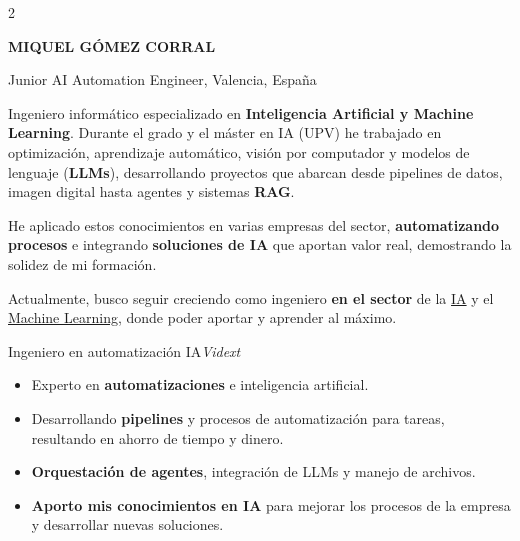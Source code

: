 \documentclass{miquelcv}
\begin{document}
\setlength{\columnsep}{0.95cm}
\begin{paracol}{2}


{\color{cvdarkblue}\Huge\bfseries MIQUEL GÓMEZ CORRAL}

\vspace{4pt}
{\color{cvblue}\large Junior AI Automation Engineer, Valencia, España}

\vspace{8pt}
{\small
Ingeniero informático especializado en \textbf{Inteligencia Artificial y Machine Learning}. Durante el grado y el máster en IA (UPV) he trabajado en optimización, aprendizaje automático, visión por computador y modelos de lenguaje (\textbf{LLMs}), desarrollando proyectos que abarcan desde pipelines de datos, imagen digital hasta agentes y sistemas \textbf{RAG}.

\vspace{4pt}
He aplicado estos conocimientos en varias empresas del sector, \textbf{automatizando procesos} e integrando \textbf{soluciones de IA} que aportan valor real, demostrando la solidez de mi formación.

\vspace{4pt}
Actualmente, busco seguir creciendo como ingeniero \textbf{en el sector} de la \underline{IA} y el \underline{Machine Learning}, donde poder aportar y aprender al máximo.
}

\vspace{4pt plus 1fill}

\newtimeline

%
  {Ingeniero en automatización IA}{\textit{Vidext}}%
  {\begin{itemize}[nosep, left=0pt]
    \item Experto en \textbf{automatizaciones} e inteligencia artificial.
    \item Desarrollando \textbf{pipelines} y procesos de automatización para tareas, resultando en ahorro de tiempo y dinero.
    \item \textbf{Orquestación de agentes}, integración de LLMs y manejo de archivos.
    \item \textbf{Aporto mis conocimientos en IA} para mejorar los procesos de la empresa y desarrollar nuevas soluciones.
   \end{itemize}
   }


\end{paracol}
\end{document}
